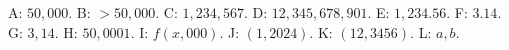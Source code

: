 \documentclass{article}
\begin{document}
A: $50,000$.
B: $>50,000$.
C: $1,234,567$.
D: $12,345,678,901$.
E: $1,234.56$.
F: $3.14$.
G: $3,14$.
H: $50,0001$.
I: $f(x,000)$.
J: $(1, 2024)$.
K: $(12, 3456)$.
L: $a,b$.
\end{document}
